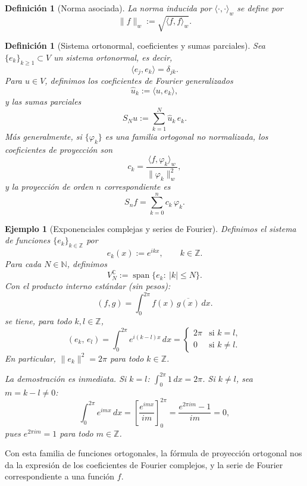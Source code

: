\documentclass[a4paper,11pt]{report}
\newtheorem{definition}[theorem]{Definición}
\newtheorem{example}[theorem]{Ejemplo}
\begin{document}
\begin{definition}[Norma asociada]
La norma inducida por $\langle\cdot,\cdot\rangle_w$ se define por
\[
\|f\|_w := \sqrt{\langle f,f\rangle_w}.
\]
\end{definition}

\begin{definition}[Sistema ortonormal, coeficientes y sumas parciales]
Sea $\{e_k\}_{k\ge 1}\subset V$ un sistema ortonormal, es decir,
\[
\langle e_j,e_k\rangle=\delta_{jk}.
\]
Para $u\in V$, definimos los coeficientes de Fourier generalizados
\[
\widehat u_k:=\langle u,e_k\rangle,
\]
y las sumas parciales
\[
S_Nu:=\sum_{k=1}^N\widehat u_k\,e_k.
\]
Más generalmente, si $\{\varphi_k\}$ es una familia ortogonal no normalizada, los coeficientes de proyección son
\[
c_k = \frac{\langle f,\varphi_k\rangle_w}{\|\varphi_k\|_w^2},
\]
y la proyección de orden $n$ correspondiente es
\[
S_n f = \sum_{k=0}^n c_k\,\varphi_k.
\]
\end{definition}

\begin{example}[Exponenciales complejas y series de Fourier]
Definimos el sistema de funciones $\{e_k\}_{k\in\mathbb Z}$ por
\begin{equation}\label{bn_complex}
e_k(x):=e^{ikx},\qquad k\in\mathbb Z.
\end{equation}
Para cada $N\in\mathbb N$, definimos
\[
V_N^{\mathbb C}:=\operatorname{span}\{e_k:\ |k|\le N\}.
\]
Con el producto interno estándar (sin pesos):
\begin{equation}\label{prod_cont}
(f,g) = \int_0^{2\pi} f(x)\,\overline{g(x)}\,dx.
\end{equation}
se tiene, para todo $k,l\in\mathbb{Z}$,
\begin{equation}\label{eq:ortog_complex}
(e_k,\,e_l) = \int_0^{2\pi}e^{i(k-l)x}\,dx =
\begin{cases} 2\pi & \text{si }k=l,\\ 0 & \text{si }k\ne l. \end{cases}
\end{equation}
En particular, $\|e_k\|^2 = 2\pi$ para todo $k\in\mathbb{Z}$.

La demostración es inmediata. Si $k=l$: $\int_0^{2\pi}1\,dx = 2\pi$. Si $k\ne l$, sea $m=k-l\ne 0$:
\[
\int_0^{2\pi}e^{imx}\,dx = \left[\frac{e^{imx}}{im}\right]_0^{2\pi} = \frac{e^{2\pi im}-1}{im} = 0,
\]
pues $e^{2\pi im}=1$ para todo $m\in\mathbb{Z}$.
\end{example}

Con esta familia de funciones ortogonales, la fórmula de proyección ortogonal nos da la expresión de los coeficientes de Fourier complejos, y la serie de Fourier correspondiente a una función $f$.
\end{document}
